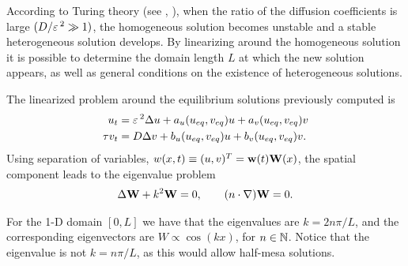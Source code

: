 According to Turing theory (see \cite{turing_chemical_1952}, \cite{murray_mathematical_2003-2}), when the ratio of the diffusion coefficients is large $(D/\varepsilon\,^2\gg 1)$, the homogeneous solution becomes unstable and a stable heterogeneous solution develops. By linearizing around the homogeneous solution it is possible to determine the domain length $L$ at which the new solution appears, as well as general conditions on the existence of heterogeneous solutions. 

The linearized problem around the equilibrium solutions previously computed is
% 
\begin{equation}
\label{eqn:linear1}
\begin{split}
\begin{aligned}
	u_t &= \varepsilon\,^2\Delta u + a_u(u_{eq},v_{eq})u + a_v(u_{eq},v_{eq})v \\
	\tau v_t &= D\Delta v + b_u(u_{eq},v_{eq})u + b_v(u_{eq},v_{eq})v.
\end{aligned}
\end{split}
\end{equation}
%
Using separation of variables, $w(x,t)\equiv(u,v)^T=\mathbf{w}(t)\mathbf{W}(x)$, the spatial component leads to the eigenvalue problem
% 
\begin{equation*}
\begin{split}
\begin{aligned}
	\Delta \mathbf{W}+k^2\mathbf{W}=0,\qquad (n\cdot\nabla)\mathbf{W}=0.
\end{aligned}
\end{split}
\end{equation*}

For the 1-D domain $[0,L]$ we have that the eigenvalues are $k=2n\pi/L$, and the corresponding eigenvectors are $W \propto \cos(k x)$, for $n\in\mathbb{N}$. Notice that the eigenvalue is not $k=n\pi/L$, as this would allow half-mesa solutions.

